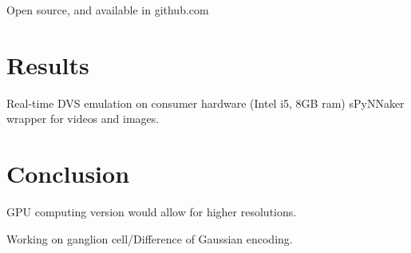 \documentclass[twocolumn]{article}
\begin{document}
Open source, and available in github.com\\

\section{Results}

Real-time DVS emulation on consumer hardware (Intel i5, 8GB ram)
sPyNNaker wrapper for videos and images.

\section{Conclusion}

GPU computing version would allow for higher resolutions.

Working on ganglion cell/Difference of Gaussian encoding.

\printbibliography
\end{document}
